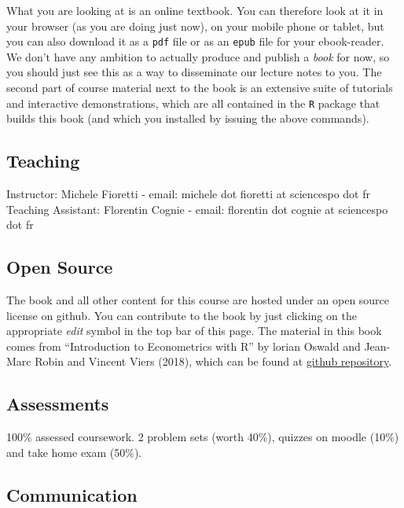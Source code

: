 \documentclass[]{book}
\begin{document}
What you are looking at is an online textbook. You can therefore look at it in your browser (as you are doing just now), on your mobile phone or tablet, but you can also download it as a \texttt{pdf} file or as an \texttt{epub} file for your ebook-reader. We don't have any ambition to actually produce and publish a \emph{book} for now, so you should just see this as a way to disseminate our lecture notes to you.
The second part of course material next to the book is an extensive suite of tutorials and interactive demonstrations, which are all contained in the \texttt{R} package that builds this book (and which you installed by issuing the above commands).

\hypertarget{teaching}{%
\subsection*{Teaching}\label{teaching}}

Instructor: Michele Fioretti - email: michele dot fioretti at sciencespo dot fr
Teaching Assistant: Florentin Cognie - email: florentin dot cognie at sciencespo dot fr

\hypertarget{open-source}{%
\subsection*{Open Source}\label{open-source}}

The book and all other content for this course are hosted under an open source license on github. You can contribute to the book by just clicking on the appropriate \emph{edit} symbol in the top bar of this page. The material in this book comes from ``Introduction to Econometrics with R'' by lorian Oswald and Jean-Marc Robin and Vincent Viers (2018), which can be found at \href{https://github.com/ScPoEcon/ScPoEconometrics}{github repository}.

\hypertarget{assessments}{%
\subsection*{Assessments}\label{assessments}}

100\% assessed coursework. 2 problem sets (worth 40\%), quizzes on moodle (10\%) and take home exam (50\%).

\hypertarget{communication}{%
\subsection*{Communication}\label{communication}}
\end{document}
